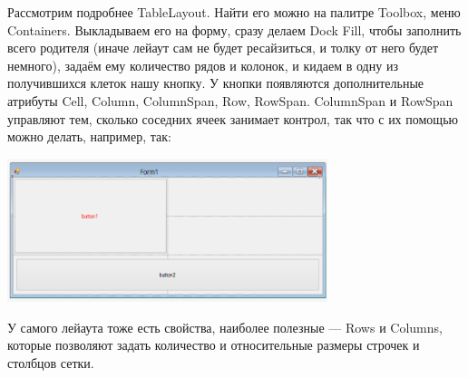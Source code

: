 \documentclass[a5paper]{article}
\begin{document}
Рассмотрим подробнее TableLayout. Найти его можно на палитре Toolbox, меню Containers. Выкладываем его на форму, сразу делаем Dock Fill, чтобы заполнить всего родителя (иначе лейаут сам не будет ресайзиться, и толку от него будет немного), задаём ему количество рядов и колонок, и кидаем в одну из получившихся клеток нашу кнопку. У кнопки появляются дополнительные атрибуты Cell, Column, ColumnSpan, Row, RowSpan. ColumnSpan и RowSpan управляют тем, сколько соседних ячеек занимает контрол, так что с их помощью можно делать, например, так:

\begin{center}
	\includegraphics[width=0.7\textwidth]{gridLayout.png}
\end{center}

У самого лейаута тоже есть свойства, наиболее полезные --- Rows и Columns, которые позволяют задать количество и относительные размеры строчек и столбцов сетки.
\end{document}
